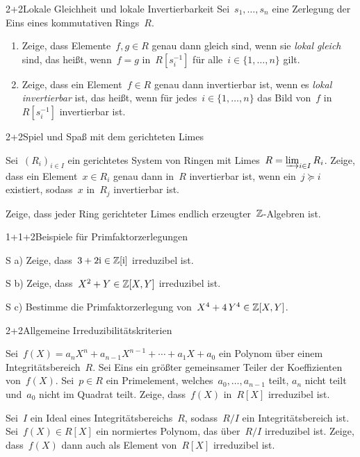 \documentclass{algblatt}
\begin{document}

\begin{aufgabe}{2+2}{Lokale Gleichheit und lokale Invertierbarkeit}
Sei~$s_1,\ldots,s_n$ eine Zerlegung der Eins eines kommutativen Rings~$R$.
\begin{enumerate}
\item Zeige, dass Elemente~$f, g \in R$ genau dann gleich sind, wenn sie
\emph{lokal gleich} sind, das heißt, wenn~$f = g$ in~$R[s_i^{-1}]$ für alle~$i
\in \{ 1,\ldots, n \}$ gilt.
\item Zeige, dass ein Element~$f \in R$ genau dann invertierbar ist, wenn es
\emph{lokal invertierbar} ist, das heißt, wenn für jedes~$i \in
\{1,\ldots,n\}$ das Bild von~$f$ in~$R[s_i^{-1}]$ invertierbar ist.
\end{enumerate}
\end{aufgabe}

\begin{aufgabeE}{2+2}{Spiel und Spaß mit dem gerichteten Limes}
\item Sei~$(R_i)_{i \in I}$ ein gerichtetes System von Ringen mit Limes~$R =
\varinjlim_{i \in I} R_i$. Zeige, dass ein Element~$x \in R_i$ genau dann
in~$R$ invertierbar ist, wenn ein~$j \succeq i$ existiert, sodass~$x$ in~$R_j$
invertierbar ist.

\item Zeige, dass jeder Ring gerichteter Limes endlich erzeugter~$\mathbb{Z}$-Algebren
ist.
\end{aufgabeE}

\begin{aufgabeE}{1+1+2}{Beispiele für Primfaktorzerlegungen}
\item[S a)] Zeige, dass~$3 + 2\mathrm{i} \in \mathbb{Z}[\mathrm{i}]$ irreduzibel ist.
\item[S b)] Zeige, dass~$X^2 + Y \in \mathbb{Z}[X,Y]$ irreduzibel ist.
\item[S c)] Bestimme die Primfaktorzerlegung von~$X^4 + 4\,Y^4 \in \mathbb{Z}[X,Y]$.
\end{aufgabeE}

\begin{aufgabeE}{2+2}{Allgemeine Irreduzibilitätskriterien}
\item Sei~$f(X) = a_n X^n + a_{n-1} X^{n-1} + \cdots + a_1 X + a_0$ ein Polynom
über einem Integritätsbereich~$R$. Sei Eins ein größter gemeinsamer Teiler der
Koeffizienten von~$f(X)$. Sei~$p \in R$ ein Primelement,
welches~$a_0,\ldots,a_{n-1}$ teilt, $a_n$ nicht teilt und~$a_0$ nicht im
Quadrat teilt. Zeige, dass~$f(X)$ in~$R[X]$ irreduzibel ist.
\item Sei~$I$ ein Ideal eines Integritätsbereichs~$R$, sodass~$R/I$ ein
Integritätsbereich ist.
Sei~$f(X) \in R[X]$ ein normiertes Polynom, das über~$R/I$ irreduzibel ist.
Zeige, dass~$f(X)$ dann auch als Element von~$R[X]$ irreduzibel ist.
\end{aufgabeE}
\end{document}
